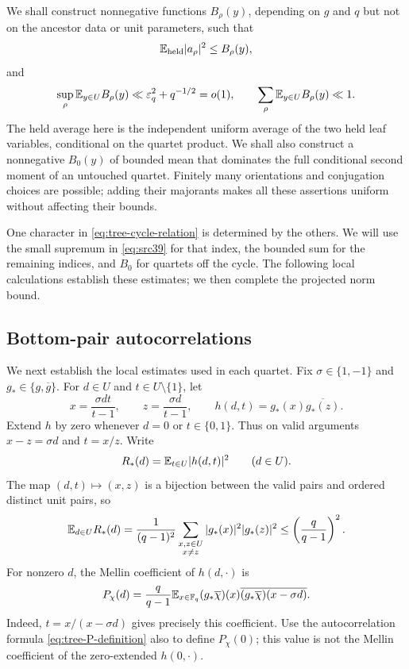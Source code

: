 We shall construct nonnegative functions $B_\rho(y)$, depending on $g$
and $q$ but not on the ancestor data or unit parameters, such that
\[
 \mathbb E_{\mathrm{held}}|a_\rho|^2\leq B_\rho(y),
\]
and
\begin{equation}\label{eq:src39}
 \sup_\rho\mathbb E_{y\in U}B_\rho(y)
       \ll\varepsilon_q^2+q^{-1/2}=o(1),\qquad
 \sum_\rho\mathbb E_{y\in U}B_\rho(y)\ll1.
\end{equation}
The held average here is the independent uniform average of the two
held leaf variables, conditional on the quartet product. We shall
also construct a nonnegative $B_0(y)$ of bounded mean that dominates
the full conditional second moment of an untouched quartet. Finitely
many orientations and conjugation choices are possible; adding their
majorants makes all these assertions uniform without affecting their
bounds.

One character in \eqref{eq:tree-cycle-relation} is determined by the
others. We will use the small supremum in \eqref{eq:src39} for that
index, the bounded sum for the remaining indices, and $B_0$ for
quartets off the cycle. The following local calculations establish
these estimates; we then complete the projected norm bound.

\subsection{Bottom-pair autocorrelations}

We next establish the local estimates used in each quartet.  Fix
$\sigma\in\{1,-1\}$ and $g_*\in\{g,\overline g\}$.  For $d\in U$ and
$t\in U\setminus\{1\}$, let
\[
 x=\frac{\sigma dt}{t-1},\qquad z=\frac{\sigma d}{t-1},\qquad
 h(d,t)=g_*(x)\overline{g_*(z)}.
\]
Extend $h$ by zero whenever $d=0$ or $t\in\{0,1\}$.  Thus on valid
arguments $x-z=\sigma d$ and $t=x/z$.
Write
\[
 R_*(d)=\mathbb E_{t\in U}|h(d,t)|^2\qquad(d\in U).
\]
The map $(d,t)\mapsto(x,z)$ is a bijection between the valid pairs and
ordered distinct unit pairs, so
\begin{equation}\label{eq:tree-R-mean}
 \mathbb E_{d\in U}R_*(d)
 =\frac1{(q-1)^2}\sum_{\substack{x,z\in U\\x\ne z}}
                   |g_*(x)|^2|g_*(z)|^2
 \leq\left(\frac q{q-1}\right)^2.
\end{equation}
For nonzero $d$, the Mellin coefficient of $h(d,\cdot)$ is
\begin{equation}\label{eq:tree-P-definition}
 P_\chi(d)=\frac q{q-1}\mathbb E_{x\in\mathbb F_q}
       (g_*\overline\chi)(x)
       \overline{(g_*\overline\chi)(x-\sigma d)}.
\end{equation}
Indeed, $t=x/(x-\sigma d)$ gives precisely this coefficient.  Use the
autocorrelation formula \eqref{eq:tree-P-definition} also to define
$P_\chi(0)$; this value is not the Mellin coefficient of the
zero-extended $h(0,\cdot)$.

